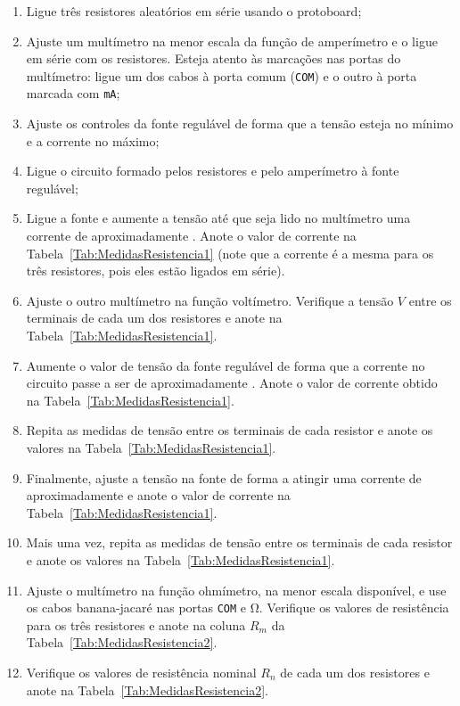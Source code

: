 \begin{enumerate}
    \item Ligue três resistores aleatórios em série usando o protoboard;
    \item Ajuste um multímetro na menor escala da função de amperímetro e o ligue em série com os resistores. Esteja atento às marcações nas portas do multímetro: ligue um dos cabos à porta comum (\texttt{COM}) e o outro à porta marcada com \texttt{mA};
    \item Ajuste os controles da fonte regulável de forma que a tensão esteja no mínimo e a corrente no máximo;
    \item Ligue o circuito formado pelos resistores e pelo amperímetro à fonte regulável;
    \item Ligue a fonte e aumente a tensão até que seja lido no multímetro uma corrente de aproximadamente . Anote o valor de corrente na Tabela~\ref{Tab:MedidasResistencia1} (note que a corrente é a mesma para os três resistores, pois eles estão ligados em série).
    \item Ajuste o outro multímetro na função voltímetro. Verifique a tensão $V$ entre os terminais de cada um dos resistores e anote na Tabela~\ref{Tab:MedidasResistencia1}.
    \item Aumente o valor de tensão da fonte regulável de forma que  a corrente no circuito passe a ser de aproximadamente . Anote o valor de corrente obtido na Tabela~\ref{Tab:MedidasResistencia1}.
    \item Repita as medidas de tensão entre os terminais de cada resistor e anote os valores na Tabela~\ref{Tab:MedidasResistencia1}.
    \item Finalmente, ajuste a tensão na fonte de forma a atingir uma corrente de aproximadamente  e anote o valor de corrente na Tabela~\ref{Tab:MedidasResistencia1}.
    \item Mais uma vez, repita as medidas de tensão entre os terminais de cada resistor e anote os valores na Tabela~\ref{Tab:MedidasResistencia1}.
    \item Ajuste o multímetro na função ohmímetro, na menor escala disponível, e use os cabos banana-jacaré nas portas \texttt{COM} e \si{\ohm}. Verifique os valores de resistência para os três resistores e anote na coluna $R_m$ da Tabela~\ref{Tab:MedidasResistencia2}.
    \item Verifique os valores de resistência nominal $R_n$ de cada um dos resistores e anote na Tabela~\ref{Tab:MedidasResistencia2}.
\end{enumerate}

